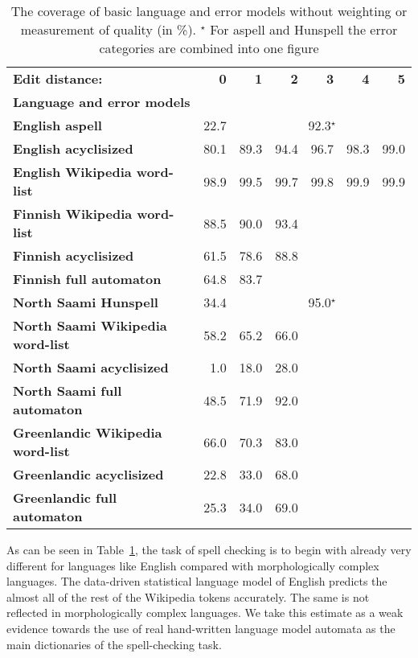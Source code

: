 \documentclass[a4paper,12pt]{article}
\begin{document}
\begin{table}
    \centering
    \begin{tabular}{|l|r|r|r|r|r|r|}
        \hline
        \bf Edit distance: & \bf 0  & \bf 1 & \bf 2 & \bf 3 & \bf 4 & \bf 5 \\
        \bf Language and error models &   &  &  &  &  &  \\
        \hline
    \bf English aspell & 22.7 & \multicolumn{5}{|c|}{92.3$^\star$}  \\
        \bf English acyclisized   & 80.1 & 89.3 & 94.4 & 96.7 & 98.3 & 99.0 \\
            \bf English Wikipedia word-list & 98.9 & 99.5 & 99.7 & 99.8 & 99.9 & 99.9 \\
        \hline
                   \bf Finnish Wikipedia word-list  & 88.5 & 90.0 & 93.4 & & & \\
                  \bf Finnish acyclisized & 61.5 & 78.6 & 88.8 & & & \\
                  \bf Finnish full automaton  & 64.8 & 83.7 & & & & \\
        \hline
        \bf North Saami Hunspell & 34.4 & \multicolumn{5}{|c|}{95.0$^\star$} \\
        \bf North Saami Wikipedia word-list & 58.2 & 65.2 & 66.0 & & & \\
               \bf North Saami acyclisized & 1.0 & 18.0 & 28.0 & & & \\
               \bf North Saami full automaton & 48.5 & 71.9 & 92.0 & & & \\
        \hline
        \bf Greenlandic Wikipedia word-list            & 66.0 & 70.3 & 83.0 & & & \\
                 \bf Greenlandic acyclisized & 22.8 & 33.0 & 68.0 & & & \\
                  \bf Greenlandic full automaton & 25.3 & 34.0 & 69.0 & & & \\
        \hline
    \end{tabular}
    \caption{The coverage of basic language and error models without weighting
        or measurement of quality (in \%).
    $^\star$ For aspell and Hunspell the error categories are combined into one
    figure\label{table:coverage}}
\end{table}

As can be seen in Table~\ref{table:coverage}, the task of spell checking is to
begin with already very different for languages like English compared
with morphologically complex languages. The data-driven statistical language
model of English predicts the almost all of the rest of the Wikipedia tokens
accurately. The same is not reflected in morphologically complex languages. We
take this estimate as a weak evidence towards the use of real hand-written
language model automata as the main dictionaries of the spell-checking task.
\end{document}
